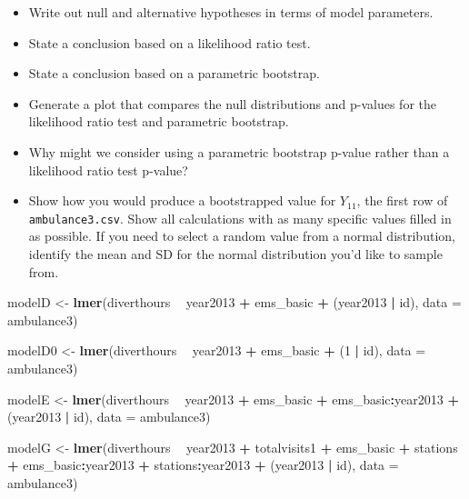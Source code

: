 \documentclass[
]{krantz}
\newenvironment{Shaded}{\begin{snugshade}}{\end{snugshade}}
\newcommand{\DataTypeTok}[1]{\textcolor[rgb]{0.27,0.27,0.27}{#1}}
\newcommand{\DecValTok}[1]{\textcolor[rgb]{0.06,0.06,0.06}{#1}}
\newcommand{\KeywordTok}[1]{\textcolor[rgb]{0.27,0.27,0.27}{\textbf{#1}}}
\newcommand{\NormalTok}[1]{#1}
\newcommand{\OperatorTok}[1]{\textcolor[rgb]{0.43,0.43,0.43}{\textbf{#1}}}
\newcommand{\StringTok}[1]{\textcolor[rgb]{0.5,0.5,0.5}{#1}}
\providecommand{\tightlist}{%
  \setlength{\itemsep}{0pt}\setlength{\parskip}{0pt}}
\begin{document}
\begin{enumerate}
  \begin{itemize}
  \tightlist
  \item
    Write out null and alternative hypotheses in terms of model parameters.
  \item
    State a conclusion based on a likelihood ratio test.
  \item
    State a conclusion based on a parametric bootstrap.
  \item
    Generate a plot that compares the null distributions and p-values for the likelihood ratio test and parametric bootstrap.
  \item
    Why might we consider using a parametric bootstrap p-value rather than a likelihood ratio test p-value?
  \item
    Show how you would produce a bootstrapped value for \(Y_{11}\), the first row of \texttt{ambulance3.csv}. Show all calculations with as many specific values filled in as possible. If you need to select a random value from a normal distribution, identify the mean and SD for the normal distribution you'd like to sample from.
  \end{itemize}
\end{enumerate}

\begin{Shaded}
\begin{Highlighting}[]
\NormalTok{modelD <-}\StringTok{ }\KeywordTok{lmer}\NormalTok{(diverthours }\OperatorTok{~}\StringTok{ }\NormalTok{year2013 }\OperatorTok{+}\StringTok{ }\NormalTok{ems_basic }\OperatorTok{+}\StringTok{ }
\StringTok{  }\NormalTok{(year2013 }\OperatorTok{|}\StringTok{ }\NormalTok{id), }\DataTypeTok{data =}\NormalTok{ ambulance3)}

\NormalTok{modelD0 <-}\StringTok{ }\KeywordTok{lmer}\NormalTok{(diverthours }\OperatorTok{~}\StringTok{ }\NormalTok{year2013 }\OperatorTok{+}\StringTok{ }\NormalTok{ems_basic }\OperatorTok{+}\StringTok{ }
\StringTok{  }\NormalTok{(}\DecValTok{1} \OperatorTok{|}\StringTok{ }\NormalTok{id), }\DataTypeTok{data =}\NormalTok{ ambulance3)}

\NormalTok{modelE <-}\StringTok{ }\KeywordTok{lmer}\NormalTok{(diverthours }\OperatorTok{~}\StringTok{ }\NormalTok{year2013 }\OperatorTok{+}\StringTok{ }\NormalTok{ems_basic }\OperatorTok{+}
\StringTok{  }\NormalTok{ems_basic}\OperatorTok{:}\NormalTok{year2013 }\OperatorTok{+}\StringTok{ }\NormalTok{(year2013 }\OperatorTok{|}\StringTok{ }\NormalTok{id), }\DataTypeTok{data =}\NormalTok{ ambulance3)}

\NormalTok{modelG <-}\StringTok{ }\KeywordTok{lmer}\NormalTok{(diverthours }\OperatorTok{~}\StringTok{ }\NormalTok{year2013 }\OperatorTok{+}\StringTok{ }\NormalTok{totalvisits1 }\OperatorTok{+}\StringTok{ }
\StringTok{  }\NormalTok{ems_basic }\OperatorTok{+}\StringTok{ }\NormalTok{stations }\OperatorTok{+}\StringTok{ }\NormalTok{ems_basic}\OperatorTok{:}\NormalTok{year2013 }\OperatorTok{+}\StringTok{ }
\StringTok{  }\NormalTok{stations}\OperatorTok{:}\NormalTok{year2013 }\OperatorTok{+}\StringTok{ }\NormalTok{(year2013 }\OperatorTok{|}\StringTok{ }\NormalTok{id), }\DataTypeTok{data =}\NormalTok{ ambulance3)}
\end{Highlighting}
\end{Shaded}
\end{document}
